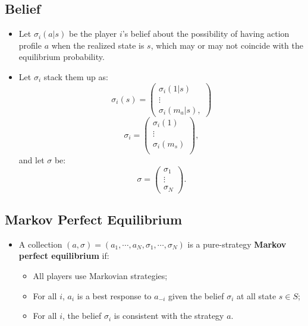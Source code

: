 \documentclass[
]{book}
\providecommand{\tightlist}{%
  \setlength{\itemsep}{0pt}\setlength{\parskip}{0pt}}
\begin{document}
\hypertarget{belief-1}{%
\subsection{Belief}\label{belief-1}}

\begin{itemize}
\tightlist
\item
  Let \(\sigma_i(a|s)\) be the player \(i\)'s belief about the possibility of having action profile \(a\) when the realized state is \(s\), which may or may not coincide with the equilibrium probability.
\item
  Let \(\sigma_i\) stack them up as:
  \[
  \sigma_i(s) =
  \begin{pmatrix}
  \sigma_i(1|s)\\
  \vdots\\
  \sigma_i(m_a|s),
  \end{pmatrix}
  \]
  \[
  \sigma_i =
  \begin{pmatrix}
  \sigma_i(1)\\
  \vdots \\
  \sigma_i(m_s)\\
  \end{pmatrix},
  \]
  and let \(\sigma\) be:
  \[
  \sigma = 
  \begin{pmatrix}
  \sigma_1 \\
  \vdots\\
  \sigma_N
  \end{pmatrix}.
  \]
\end{itemize}

\hypertarget{markov-perfect-equilibrium}{%
\subsection{Markov Perfect Equilibrium}\label{markov-perfect-equilibrium}}

\begin{itemize}
\tightlist
\item
  A collection \((a, \sigma) = (a_1, \cdots, a_N, \sigma_1, \cdots, \sigma_N)\) is a pure-strategy \textbf{Markov perfect equilibrium} if:

  \begin{itemize}
  \tightlist
  \item
    All players use Markovian strategies;
  \item
    For all \(i\), \(a_i\) is a best response to \(a_{-i}\) given the belief \(\sigma_i\) at all state \(s \in S\);
  \item
    For all \(i\), the belief \(\sigma_i\) is consistent with the strategy \(a\).
  \end{itemize}
\end{itemize}
\end{document}
